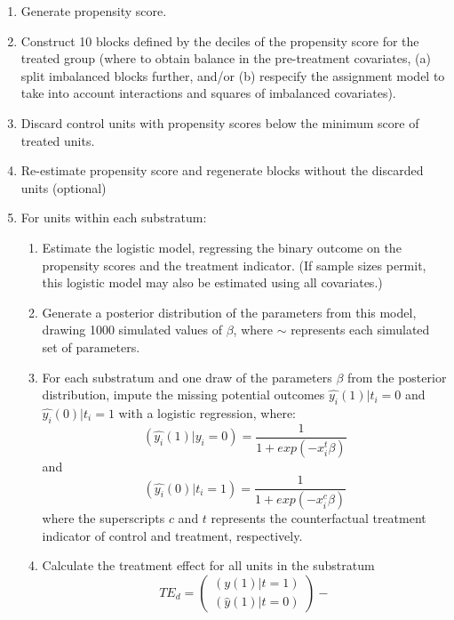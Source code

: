 \documentclass[11pt,titlepage]{article}
\begin{document}
\begin{enumerate}
\item Generate propensity score.
\item Construct 10 blocks defined by the deciles of the propensity
  score for the treated group (where to obtain balance
  in the pre-treatment covariates, (a) split imbalanced blocks further, and/or
  (b) respecify the assignment model
  to take into account interactions and squares of imbalanced
  covariates).
\item Discard control units with propensity scores below the minimum
  score of treated units.
\item Re-estimate propensity score and regenerate blocks without the
  discarded units (optional)
\item For units within each substratum: \label{sub}
  \begin{enumerate}
  \item{Estimate the logistic model, regressing
      the binary outcome on the propensity scores and the treatment
      indicator.  (If sample sizes permit, this logistic model may
      also be estimated using all covariates.)} \label{sub1}
  \item{Generate a posterior distribution of the parameters from this
      model, drawing 1000 simulated values of $\beta$, where $\sim$
      represents each simulated set of parameters.}
  \item{For each substratum and one draw of the parameters $\beta$ from the
      posterior distribution, impute the missing potential outcomes
      $\hat{y_i}(1)|t_i=0$ and $\hat{y_i}(0)|t_i=1$ with a logistic regression,
      where:
      \begin{equation}
        (\hat{y_i}(1)|y_i=0) = \frac{1}{1+exp(-x_i^t \beta)}
      \end{equation}
      and 
      \begin{equation}
        (\hat{y_i}(0)|t_i=1) = \frac{1}{1+exp(-x_i^c \beta)}
      \end{equation}
      where the superscripts $c$ and $t$ represents the counterfactual
      treatment indicator of control and treatment, respectively.}
  \item{Calculate the treatment effect for all units 
      in the substratum
      \begin{equation}
        TE_{d} = \left( \begin{array}{c}
            (y(1) | t=1) \\
            (\hat{y}(1) | t=0)
          \end{array} \right)- 

\end{equation}}
\end{enumerate}
\end{enumerate}
\end{document}
